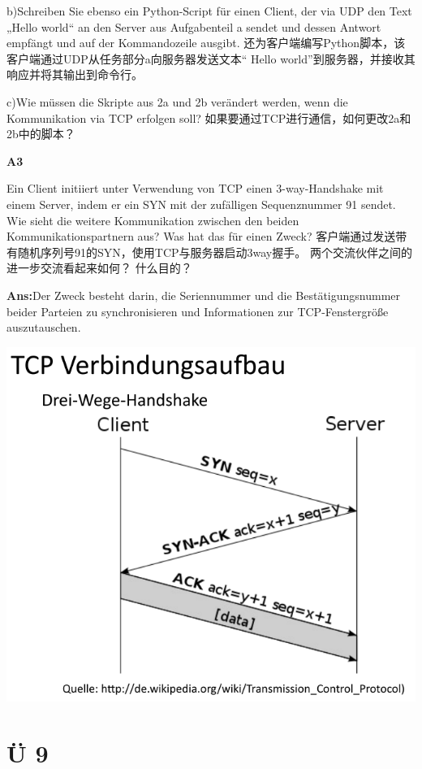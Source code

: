 \documentclass[fleqn]{article}
\begin{document}
b)Schreiben Sie ebenso ein Python-Script für einen Client, der via UDP den Text „Hello world“ an den Server aus Aufgabenteil a sendet und dessen Antwort empfängt und auf der Kommandozeile ausgibt.
还为客户端编写Python脚本，该客户端通过UDP从任务部分a向服务器发送文本“ Hello world”到服务器，并接收其响应并将其输出到命令行。

c)Wie müssen die Skripte aus 2a und 2b verändert werden, wenn die Kommunikation via TCP erfolgen soll?
如果要通过TCP进行通信，如何更改2a和2b中的脚本？

\noindent\textbf{A3}

Ein Client initiiert unter Verwendung von TCP einen 3-way-Handshake mit einem Server, indem er ein SYN mit der zufälligen Sequenznummer 91 sendet. Wie sieht die weitere Kommunikation zwischen den beiden Kommunikationspartnern aus? Was hat das für einen Zweck?
客户端通过发送带有随机序列号91的SYN，使用TCP与服务器启动3way握手。 两个交流伙伴之间的进一步交流看起来如何？ 什么目的？

\textbf{Ans:}Der Zweck besteht darin, die Seriennummer und die Bestätigungsnummer beider Parteien zu synchronisieren und Informationen zur TCP-Fenstergröße auszutauschen.

\begin{center}
    \includegraphics[scale=0.5]{bild18.png}
\end{center}



\section{Ü 9}
\end{document}

